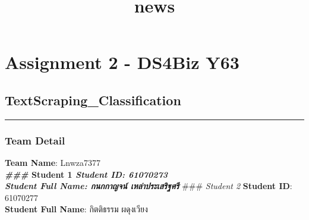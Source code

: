 \documentclass[11pt]{article}
\title{news}
\begin{document}
    
    
    \maketitle
    
    

    
    \section{Assignment 2 - DS4Biz Y63}\label{assignment-2---ds4biz-y63}

\subsection{TextScraping\_Classification}\label{textscraping_classification}

\begin{center}\rule{0.5\linewidth}{\linethickness}\end{center}

\subsubsection{Team Detail}\label{team-detail}

\textbf{Team Name}: Lnwza7377\\
\textbf{\emph{ \#\#\# }Student 1\emph{ \textbf{Student ID}: 61070273\\
\textbf{Student Full Name}: กนกกาญจน์ เหล่าประเสริฐศรี }} \#\#\#
\emph{Student 2} \textbf{Student ID}: 61070277\\
\textbf{Student Full Name}: กิตติธรรม ผดุงเวียง
\end{document}
